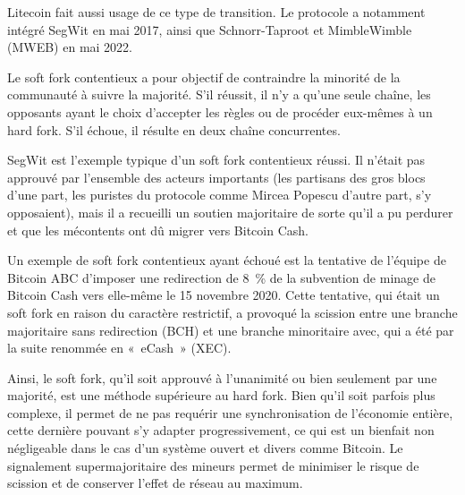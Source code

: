 Litecoin fait aussi usage de ce type de transition. Le protocole a notamment intégré SegWit en mai 2017, ainsi que Schnorr-Taproot et MimbleWimble (MWEB) en mai 2022.

Le soft fork contentieux a pour objectif de contraindre la minorité de la communauté à suivre la majorité. S'il réussit, il n'y a qu'une seule chaîne, les opposants ayant le choix d'accepter les règles ou de procéder eux-mêmes à un hard fork. S'il échoue, il résulte en deux chaîne concurrentes.

SegWit est l'exemple typique d'un soft fork contentieux réussi. Il n'était pas approuvé par l'ensemble des acteurs importants (les partisans des gros blocs d'une part, les puristes du protocole comme Mircea Popescu d'autre part, s'y opposaient), mais il a recueilli un soutien majoritaire de sorte qu'il a pu perdurer et que les mécontents  ont dû migrer vers Bitcoin Cash.

Un exemple de soft fork contentieux ayant échoué est la tentative de l'équipe de Bitcoin ABC d'imposer une redirection de 8~\% de la subvention de minage de Bitcoin Cash vers elle-même le 15 novembre 2020. Cette tentative, qui était un soft fork en raison du caractère restrictif, a provoqué la scission entre une branche majoritaire sans redirection (BCH) et une branche minoritaire avec, qui a été par la suite renommée en «~eCash~» (XEC).

Ainsi, le soft fork, qu'il soit approuvé à l'unanimité ou bien seulement par une majorité, est une méthode supérieure au hard fork. Bien qu'il soit parfois plus complexe, il permet de ne pas requérir une synchronisation de l'économie entière, cette dernière pouvant s'y adapter progressivement, ce qui est un bienfait non négligeable dans le cas d'un système ouvert et divers comme Bitcoin. Le signalement supermajoritaire des mineurs permet de minimiser le risque de scission et de conserver l'effet de réseau au maximum.

